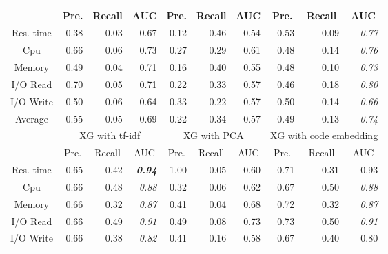 \documentclass[10pt,journal,compsoc]{IEEEtran}
\begin{document}
\begin{table}
\begin{tabular}{|c|r|r|r|r|r|r|r|r|r|}
                  & \multicolumn{1}{c|}{Pre.} & \multicolumn{1}{c|}{Recall} & \multicolumn{1}{c|}{AUC} & \multicolumn{1}{c|}{Pre.} & \multicolumn{1}{c|}{Recall} & \multicolumn{1}{c|}{AUC} & \multicolumn{1}{c|}{Pre.} & \multicolumn{1}{c|}{Recall} & \multicolumn{1}{c|}{AUC} \\ \hline
Res. time         & 0.38  & 0.03    & 0.67 & 0.12  & 0.46    & 0.54 & 0.53  & 0.09    & \textit{0.77}            \\ \hline
Cpu               & 0.66  & 0.06    & 0.73 & 0.27  & 0.29    & 0.61 & 0.48  & 0.14    & \textit{0.76}            \\ \hline
Memory            & 0.49  & 0.04    & 0.71 & 0.16  & 0.40    & 0.55 & 0.48  & 0.10    & \textit{0.73}            \\ \hline
I/O Read          & 0.70  & 0.05    & 0.71 & 0.22  & 0.33    & 0.57 & 0.46  & 0.18    & \textit{0.80}            \\ \hline
I/O Write         & 0.50  & 0.06    & 0.64 & 0.33  & 0.22    & 0.57 & 0.50  & 0.14    & \textit{0.66}            \\ \hline
Average           & 0.55  & 0.05    & 0.69 & 0.22  & 0.34    & 0.57 & 0.49  & 0.13    & \textit{0.74}            \\ \hline
\multirow{2}{*}{} & \multicolumn{3}{c|}{XG with tf-idf}        & \multicolumn{3}{c|}{XG with PCA}           & \multicolumn{3}{c|}{XG with code embedding}\\ \cline{2-10} 
                  & \multicolumn{1}{c|}{Pre.} & \multicolumn{1}{c|}{Recall} & \multicolumn{1}{c|}{AUC} & \multicolumn{1}{c|}{Pre.} & \multicolumn{1}{c|}{Recall} & \multicolumn{1}{c|}{AUC} & \multicolumn{1}{c|}{Pre.} & \multicolumn{1}{c|}{Recall} & \multicolumn{1}{c|}{AUC} \\ \hline
Res. time         & 0.65  & 0.42    & \textit{\textbf{0.94}}   & 1.00  & 0.05    & 0.60 & 0.71  & 0.31    & 0.93 \\ \hline
Cpu               & 0.66  & 0.48    & \textit{0.88}            & 0.32  & 0.06    & 0.62 & 0.67  & 0.50    & \textit{0.88}            \\ \hline
Memory            & 0.66  & 0.32    & \textit{0.87}            & 0.41  & 0.04    & 0.68 & 0.72  & 0.32    & \textit{0.87}            \\ \hline
I/O Read          & 0.66  & 0.49    & \textit{0.91}            & 0.49  & 0.08    & 0.73 & 0.73  & 0.50    & \textit{0.91}            \\ \hline
I/O Write         & 0.66  & 0.38    & \textit{0.82}            & 0.41  & 0.16    & 0.58 & 0.67  & 0.40    & 0.80 \\ \hline

\end{tabular}
\end{table}
\end{document}
